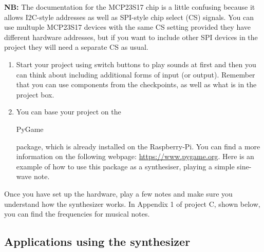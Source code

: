 
\vspace*{-0.5cm}

{\bf NB:} The documentation for the MCP23S17 chip is a little confusing because it allows I2C-style addresses as well as SPI-style chip select (CS) signals.
You can use multuple MCP23S17 devices with the same CS setting provided they have different hardware addresses, but if you want to include other SPI devices in the project they will need a separate CS as usual.
 
\begin{enumerate}
\item Start your project using switch buttons to play sounds at first and then you can think about including additional forms of input (or output).
Remember that you can use components from the checkpoints, as well as what is in the project box.

\item You can base your project on the \begin{tt}PyGame\end{tt} package, which is already installed on the Raspberry-Pi.
You can find a more information on the following webpage: \url{https://www.pygame.org}.
Here is an example of how to use this package as a synthesiser, playing a simple sine-wave note.\\


\vspace*{-0.5cm}
\end{enumerate}

Once you have set up the hardware, play a few notes and make sure you understand how the synthesizer works. In Appendix 1 of project C, shown below, you can find the frequencies for musical notes.


\subsection{Applications using the synthesizer}

